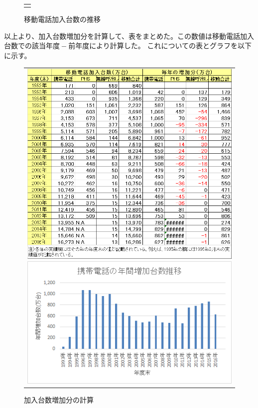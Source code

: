 \documentclass[uplatex, titlepage]{jsarticle}
\begin{document}
\begin{figure}[H]
\begin{tabular}{c}
\begin{minipage}{0.5\hsize}
\begin{center}
          \caption{移動電話加入台数の推移}
          \label{fig:graphicx1}
        \end{center}
      \end{minipage}
    \end{tabular}
\end{figure}


以上より、加入台数増加分を計算して、表をまとめた。この数値は移動電話加入台数での$該当年度-前年度$により計算した。
これについての表とグラフを以下に示す。


\begin{figure}[H]
  \centering
    \begin{tabular}{c}
      \begin{minipage}{0.5\hsize}
        \begin{center}
          \includegraphics[scale = 0.5]{re2/f3.png}
          \caption{加入台数増加分の計算}
          \label{fig:table2}
        \end{center}
      \end{minipage}
      \begin{minipage}{0.5\hsize}
        \begin{center}
          \includegraphics[scale = 0.9]{re2/f4.png}

\end{center}
\end{minipage}
\end{tabular}
\end{figure}
\end{document}
